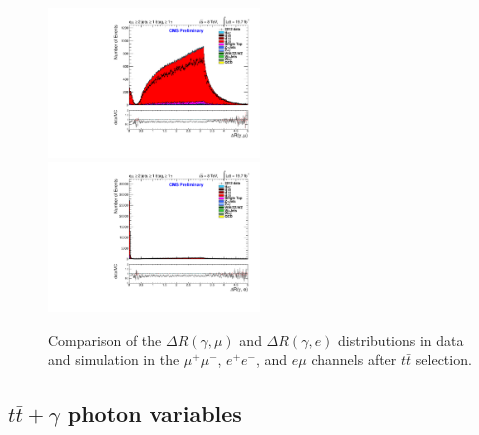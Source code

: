\documentclass[oneside, a4paper, 11pt, ]{report}
\begin{document}
\begin{figure}
\includegraphics[width=0.5\textwidth]{Plots/ControlPlots/TTbarDiLeptonAnalysis/EMu/Photons/AllPhotons/Photon_deltaR_muons_splitTTbar_ratio.pdf}
\includegraphics[width=0.5\textwidth]{Plots/ControlPlots/TTbarDiLeptonAnalysis/EMu/Photons/AllPhotons/Photon_deltaR_electrons_splitTTbar_ratio.pdf}
\caption{Comparison of the $\Delta R(\gamma, \mu)$ and $\Delta R(\gamma, e)$ distributions in data and simulation in the $\mu^{+}\mu^{-}$, $e^{+}e^{-}$, and $e\mu$ channels after $t\bar{t}$ selection.}
\label{fig-ttbarDRmuonsAndDRelectrons}
\end{figure}

\subsection{$t\bar{t}+\gamma$ photon variables}
\end{document}
